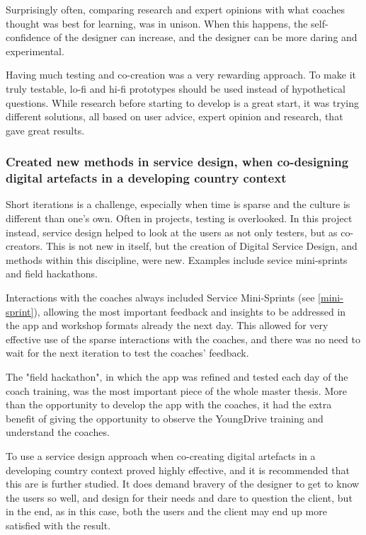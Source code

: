 Surprisingly often, comparing research and expert opinions with what coaches thought was best for learning, was in unison. When this happens, the self-confidence of the designer can increase, and the designer can be more daring and experimental.

Having much testing and co-creation was a very rewarding approach. To make it truly testable, lo-fi and hi-fi prototypes should be used instead of hypothetical questions. While research before starting to develop is a great start, it was trying different solutions, all based on user advice, expert opinion and research, that gave great results.

\subsubsection{Created new methods in service design, when co-designing digital artefacts in a developing country context}
Short iterations is a challenge, especially when time is sparse and the culture is different than one's own. Often in projects, testing is overlooked. In this project instead, service design helped to look at the users as not only testers, but as co-creators. This is not new in itself, but the creation of Digital Service Design, and methods within this discipline, were new. Examples include sevice mini-sprints and field hackathons.

Interactions with the coaches always included Service Mini-Sprints (see \ref{mini-sprint}), allowing the most important feedback and insights to be addressed in the app and workshop formats already the next day. This allowed for very effective use of the sparse interactions with the coaches, and there was no need to wait for the next iteration to test the coaches' feedback.

The "field hackathon", in which the app was refined and tested each day of the coach training, was the most important piece of the whole master thesis. More than the opportunity to develop the app with the coaches, it had the extra benefit of giving the opportunity to observe the YoungDrive training and understand the coaches.

To use a service design approach when co-creating digital artefacts in a developing country context proved highly effective, and it is recommended that this are is further studied. It does demand bravery of the designer to get to know the users so well, and design for their needs and dare to question the client, but in the end, as in this case, both the users and the client may end up more satisfied with the result.


